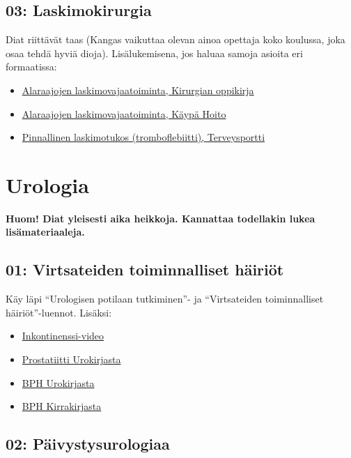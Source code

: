 \documentclass[
]{book}
\providecommand{\tightlist}{%
  \setlength{\itemsep}{0pt}\setlength{\parskip}{0pt}}
\begin{document}
\subsection{03: Laskimokirurgia}\label{laskimokirurgia}

Diat riittävät taas (Kangas vaikuttaa olevan ainoa opettaja koko koulussa, joka osaa tehdä hyviä dioja). Lisälukemisena, jos haluaa samoja asioita eri formaatissa:

\begin{itemize}
\tightlist
\item
  \href{https://www.oppiportti.fi/oppikirjat/kia00437}{Alaraajojen laskimovajaatoiminta, Kirurgian oppikirja}
\item
  \href{https://www.kaypahoito.fi/hoi05030}{Alaraajojen laskimovajaatoiminta, Käypä Hoito}
\item
  \href{https://www.terveysportti.fi/apps/dtk/ltk/article/ykt00146/}{Pinnallinen laskimotukos (tromboflebiitti), Terveysportti}
\end{itemize}

\section{Urologia}\label{urologia}

\textbf{Huom! Diat yleisesti aika heikkoja. Kannattaa todellakin lukea lisämateriaaleja.}

\subsection{01: Virtsateiden toiminnalliset häiriöt}\label{Virtsateiden-toiminnalliset-hairiot}

Käy läpi ``Urologisen potilaan tutkiminen''- ja ``Virtsateiden toiminnalliset häiriöt''-luennot. Lisäksi:

\begin{itemize}
\tightlist
\item
  \href{https://youtu.be/Vli_6spE8HY?si=DMgq-x4hyavj92bL}{Inkontinenssi-video}
\item
  \href{https://www.oppiportti.fi/oppikirjat/uro02102}{Prostatiitti Urokirjasta}
\item
  \href{https://www.oppiportti.fi/oppikirjat/uro02200}{BPH Urokirjasta}
\item
  \href{https://www.oppiportti.fi/oppikirjat/kia00306}{BPH Kirrakirjasta}
\end{itemize}

\subsection{02: Päivystysurologiaa}\label{Paivystysurologiaa}
\end{document}
